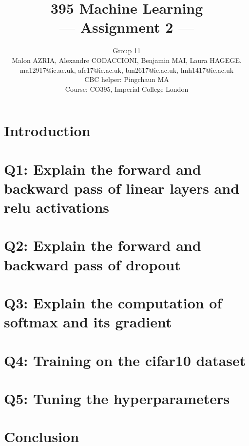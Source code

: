 \documentclass[a4paper,11pt]{article}
\title{395 Machine Learning\\\Large{--- Assignment 2 ---}}
\author{Group 11\\Malon AZRIA, Alexandre CODACCIONI, Benjamin MAI,
  Laura HAGEGE.\\
  ma12917@ic.ac.uk, afc17@ic.ac.uk, bm2617@ic.ac.uk, lmh1417@ic.ac.uk \\
       \small{CBC helper: Pingchaun MA}\\
       \small{Course: CO395, Imperial College London}
}
\begin{document}
\maketitle

\section{Introduction}
    

\section{Q1: Explain the forward and backward pass of linear layers and relu activations}
    

\section{Q2: Explain the forward and backward pass of dropout}
    

\newpage
\section{Q3: Explain the computation of softmax and its gradient}
    

\section{Q4: Training on the cifar10 dataset}
    

\section{Q5: Tuning the hyperparameters}
    
    
\section{Conclusion}
    
\end{document}
